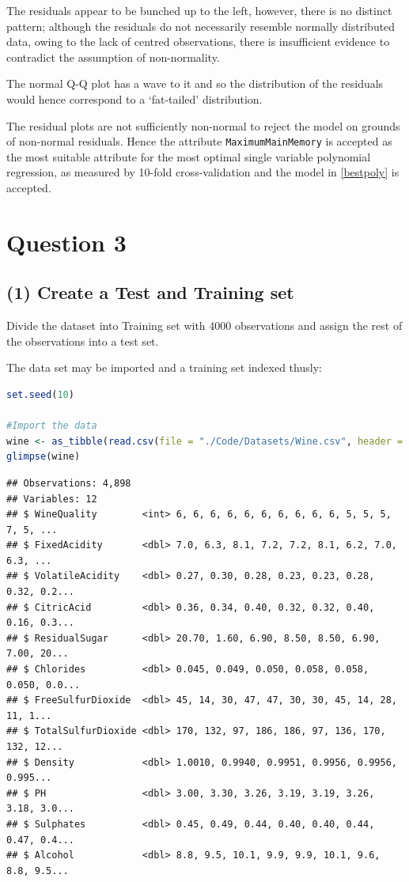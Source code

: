 \documentclass[
]{article}
\newcommand{\passthrough}[1]{#1}
\begin{document}
The residuals appear to be bunched up to the left, however, there is no
distinct pattern; although the residuals do not necessarily resemble normally
distributed data, owing to the lack of centred observations, there is insufficient evidence to contradict the assumption of non-normality. 

The normal Q-Q plot has a wave to it and so the
distribution of the residuals would hence correspond to a `fat-tailed'
distribution.

The residual plots are not sufficiently non-normal to reject the model
on grounds of non-normal residuals. Hence the attribute
\passthrough{\lstinline!MaximumMainMemory!} is accepted as the most
suitable attribute for the most optimal single variable polynomial
regression, as measured by 10-fold cross-validation and the model in \eqref{bestpoly} is accepted.

\newpage

\hypertarget{question-3---wine-trees}{%
\section{Question 3}\label{question-3---wine-trees}}

\hypertarget{create-a-test-and-training-set}{%
\subsection{(1) Create a Test and Training
set}\label{create-a-test-and-training-set}}

Divide the dataset into Training set with 4000 observations and assign the
rest of the observations into a test set. 

The data set may be imported and a training set indexed thusly:

\begin{lstlisting}[language=R]
set.seed(10)

#Import the data
wine <- as_tibble(read.csv(file = "./Code/Datasets/Wine.csv", header = TRUE, sep = ","))
glimpse(wine)
\end{lstlisting}

\begin{lstlisting}[basicstyle=\footnotesize \ttfamily]
## Observations: 4,898
## Variables: 12
## $ WineQuality        <int> 6, 6, 6, 6, 6, 6, 6, 6, 6, 6, 5, 5, 5, 7, 5, ...
## $ FixedAcidity       <dbl> 7.0, 6.3, 8.1, 7.2, 7.2, 8.1, 6.2, 7.0, 6.3, ...
## $ VolatileAcidity    <dbl> 0.27, 0.30, 0.28, 0.23, 0.23, 0.28, 0.32, 0.2...
## $ CitricAcid         <dbl> 0.36, 0.34, 0.40, 0.32, 0.32, 0.40, 0.16, 0.3...
## $ ResidualSugar      <dbl> 20.70, 1.60, 6.90, 8.50, 8.50, 6.90, 7.00, 20...
## $ Chlorides          <dbl> 0.045, 0.049, 0.050, 0.058, 0.058, 0.050, 0.0...
## $ FreeSulfurDioxide  <dbl> 45, 14, 30, 47, 47, 30, 30, 45, 14, 28, 11, 1...
## $ TotalSulfurDioxide <dbl> 170, 132, 97, 186, 186, 97, 136, 170, 132, 12...
## $ Density            <dbl> 1.0010, 0.9940, 0.9951, 0.9956, 0.9956, 0.995...
## $ PH                 <dbl> 3.00, 3.30, 3.26, 3.19, 3.19, 3.26, 3.18, 3.0...
## $ Sulphates          <dbl> 0.45, 0.49, 0.44, 0.40, 0.40, 0.44, 0.47, 0.4...
## $ Alcohol            <dbl> 8.8, 9.5, 10.1, 9.9, 9.9, 10.1, 9.6, 8.8, 9.5...
\end{lstlisting}
\end{document}
